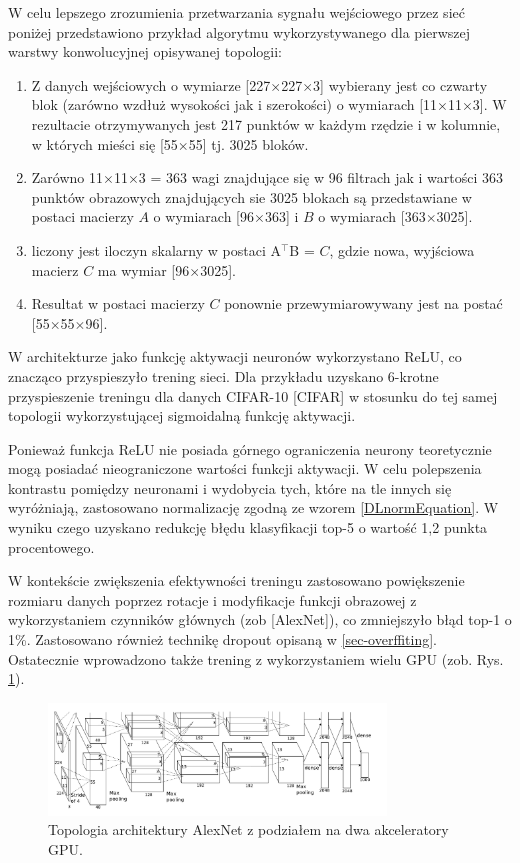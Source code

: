 W celu lepszego zrozumienia przetwarzania sygnału wejściowego przez sieć poniżej przedstawiono przykład algorytmu wykorzystywanego dla pierwszej warstwy konwolucyjnej opisywanej topologii: 
\begin{enumerate}
\item Z danych wejściowych o wymiarze [227$\times$227$\times$3] wybierany jest co czwarty blok (zarówno wzdłuż wysokości jak i szerokości) o wymiarach [11$\times$11$\times$3]. W rezultacie otrzymywanych jest 217 punktów w każdym rzędzie i w kolumnie, w których mieści się [55$\times$55] tj. 3025 bloków.
\item Zarówno 11$\times$11$\times$3 = 363 wagi znajdujące się w 96 filtrach jak i wartości 363 punktów obrazowych znajdujących sie 3025 blokach są przedstawiane w postaci macierzy $A$ o wymiarach [96$\times$363] i $B$ o wymiarach [363$\times$3025].
\item liczony jest iloczyn skalarny w postaci A$^\intercal$B = $C$, gdzie nowa, wyjściowa macierz $C$ ma wymiar [96$\times$3025].
\item Resultat w postaci macierzy $C$ ponownie przewymiarowywany jest na postać [55$\times$55$\times$96].  
\end{enumerate} 

W architekturze jako funkcję aktywacji neuronów wykorzystano ReLU, co znacząco przyspieszyło trening sieci. Dla przykładu uzyskano 6-krotne przyspieszenie treningu dla danych CIFAR-10 [CIFAR] w stosunku do tej samej topologii wykorzystującej sigmoidalną funkcję aktywacji.

Ponieważ funkcja ReLU nie posiada górnego ograniczenia neurony teoretycznie mogą posiadać nieograniczone wartości funkcji aktywacji. W celu polepszenia kontrastu pomiędzy neuronami i wydobycia tych, które na tle innych się wyróżniają, zastosowano normalizację zgodną ze wzorem \ref{DLnormEquation}. W wyniku czego uzyskano redukcję błędu klasyfikacji top-5 o wartość 1,2 punkta procentowego.

W kontekście zwiększenia efektywności treningu zastosowano powiększenie rozmiaru danych poprzez rotacje i modyfikacje funkcji obrazowej z wykorzystaniem czynników głównych (zob [AlexNet]), co zmniejszyło błąd top-1 o 1\%. Zastosowano również technikę dropout opisaną w \ref{sec-overffiting}. Ostatecznie wprowadzono także trening z wykorzystaniem wielu GPU (zob. Rys. \ref{AlexNetTopologyMultiGPU}). 

\begin{figure}[h!]
	\centering
	\includegraphics[width=0.8\textwidth]{figures/AlexNet-multiGPU.png}
	\caption{Topologia architektury AlexNet z podziałem na dwa akceleratory GPU.}
	\label{AlexNetTopologyMultiGPU}
\end{figure}

